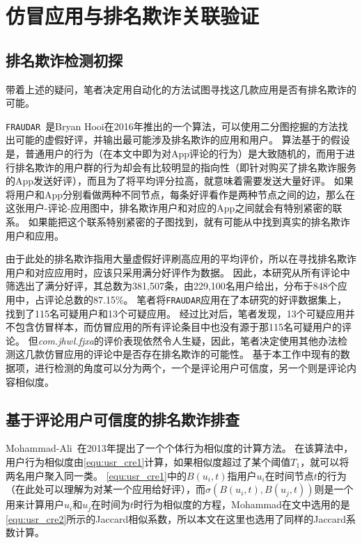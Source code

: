 \section{仿冒应用与排名欺诈关联验证}

\subsection{排名欺诈检测初探}

带着上述的疑问，笔者决定用自动化的方法试图寻找这几款应用是否有排名欺诈的可能。

\texttt{FRAUDAR}~\cite{hooi2016fraudar}是Bryan Hooi在2016年推出的一个算法，可以使用二分图挖掘的方法找出可能的虚假好评，并输出最可能涉及排名欺诈的应用和用户。
算法基于的假设是，普通用户的行为（在本文中即为对App评论的行为）是大致随机的，而用于进行排名欺诈的用户群的行为却会有比较明显的指向性（即针对购买了排名欺诈服务的App发送好评），而且为了将平均评分拉高，就意味着需要发送大量好评。
如果将用户和App分别看做两种不同节点，每条好评看作是两种节点之间的边，那么在这张用户-评论-应用图中，排名欺诈用户和对应的App之间就会有特别紧密的联系。
如果能把这个联系特别紧密的子图找到，就有可能从中找到真实的排名欺诈用户和应用。

由于此处的排名欺诈指用大量虚假好评刷高应用的平均评价，所以在寻找排名欺诈用户和对应应用时，应该只采用满分好评作为数据。
因此，本研究从所有评论中筛选出了满分好评，其总数为381,507条，由229,100名用户给出，分布于848个应用中，占评论总数的87.15\%。
笔者将\texttt{FRAUDAR}应用在了本研究的好评数据集上，找到了115名可疑用户和13个可疑应用。
经过比对后，笔者发现，13个可疑应用并不包含仿冒样本，而仿冒应用的所有评论条目中也没有源于那115名可疑用户的评论。
但\emph{com.jhwl.fjxa}的评价表现依然令人生疑，因此，笔者决定使用其他办法检测这几款仿冒应用的评论中是否存在排名欺诈的可能性。
基于本工作中现有的数据项，进行检测的角度可以分为两个，一个是评论用户可信度，另一个则是评论内容相似度。

\subsection{基于评论用户可信度的排名欺诈排查}

Mohammad-Ali~\cite{abbasi2013measuring}在2013年提出了一个个体行为相似度的计算方法。
在该算法中，用户行为相似度由\autoref{equ:usr_cre1}计算，如果相似度超过了某个阈值$T_1$，就可以将两名用户聚入同一类。
\autoref{equ:usr_cre1}中的$B(u_i, t)$指用户$u_i$在时间节点$t$的行为（在此处可以理解为对某一个应用给好评），而$\sigma(B(u_i, t), B(u_j, t))$则是一个用来计算用户$u_i$和$u_j$在时间为$t$时行为相似度的方程，Mohammad在文中选用的是\autoref{equ:usr_cre2}所示的Jaccard相似系数，所以本文在这里也选用了同样的Jaccard系数计算。

